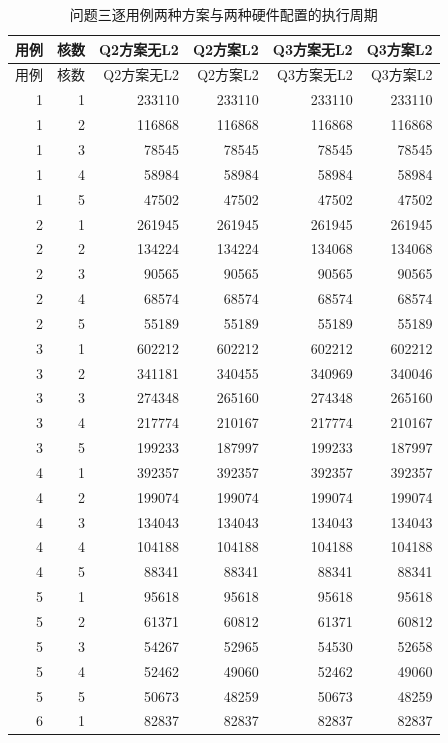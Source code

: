 \begin{longtable}{rrrrrr}
\caption{问题三逐用例两种方案与两种硬件配置的执行周期}\label{tab:q3-time}\\
\toprule 用例 & 核数 & Q2方案无L2 & Q2方案L2 & Q3方案无L2 & Q3方案L2\\\midrule
\endfirsthead
\toprule 用例 & 核数 & Q2方案无L2 & Q2方案L2 & Q3方案无L2 & Q3方案L2\\\midrule
\endhead
1 & 1 & 233110 & 233110 & 233110 & 233110 \\
1 & 2 & 116868 & 116868 & 116868 & 116868 \\
1 & 3 & 78545 & 78545 & 78545 & 78545 \\
1 & 4 & 58984 & 58984 & 58984 & 58984 \\
1 & 5 & 47502 & 47502 & 47502 & 47502 \\
2 & 1 & 261945 & 261945 & 261945 & 261945 \\
2 & 2 & 134224 & 134224 & 134068 & 134068 \\
2 & 3 & 90565 & 90565 & 90565 & 90565 \\
2 & 4 & 68574 & 68574 & 68574 & 68574 \\
2 & 5 & 55189 & 55189 & 55189 & 55189 \\
3 & 1 & 602212 & 602212 & 602212 & 602212 \\
3 & 2 & 341181 & 340455 & 340969 & 340046 \\
3 & 3 & 274348 & 265160 & 274348 & 265160 \\
3 & 4 & 217774 & 210167 & 217774 & 210167 \\
3 & 5 & 199233 & 187997 & 199233 & 187997 \\
4 & 1 & 392357 & 392357 & 392357 & 392357 \\
4 & 2 & 199074 & 199074 & 199074 & 199074 \\
4 & 3 & 134043 & 134043 & 134043 & 134043 \\
4 & 4 & 104188 & 104188 & 104188 & 104188 \\
4 & 5 & 88341 & 88341 & 88341 & 88341 \\
5 & 1 & 95618 & 95618 & 95618 & 95618 \\
5 & 2 & 61371 & 60812 & 61371 & 60812 \\
5 & 3 & 54267 & 52965 & 54530 & 52658 \\
5 & 4 & 52462 & 49060 & 52462 & 49060 \\
5 & 5 & 50673 & 48259 & 50673 & 48259 \\
6 & 1 & 82837 & 82837 & 82837 & 82837 \\

\end{longtable}
